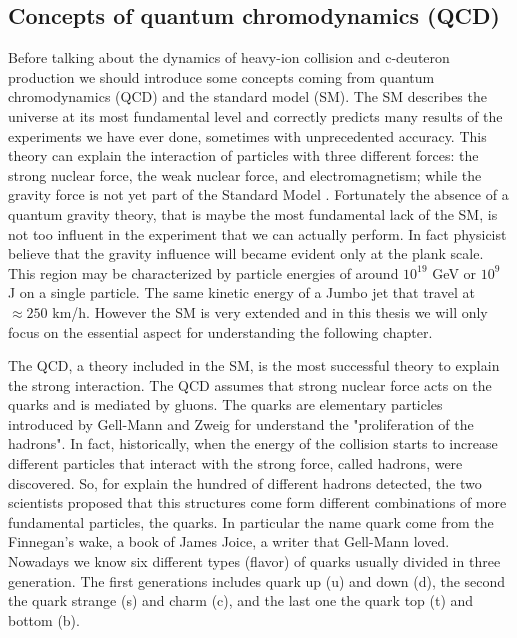 \documentclass[12pt,a4paper]{book}
\begin{document}
	\subsection{Concepts of quantum chromodynamics (QCD)}
	Before talking about the dynamics of heavy-ion collision and c-deuteron production we should introduce some concepts coming from quantum chromodynamics (QCD) and the standard model (SM). The SM describes the universe at its most fundamental level and correctly predicts many results of the experiments we have ever done, sometimes with unprecedented accuracy. This theory can explain the interaction of particles with three different forces: the strong nuclear force, the weak nuclear force, and electromagnetism; while the gravity force is not yet part of the Standard Model \cite{quevedo2024cambridgelecturesstandardmodel}. Fortunately the absence of a quantum gravity theory, that is maybe the most fundamental lack of the SM, is not too influent in the experiment that we can actually perform. In fact physicist believe that the gravity influence will became evident only at the plank scale. This region may be characterized by particle energies of around $10^{19}$ GeV or $10^9$ J on a single particle. The same kinetic energy of a Jumbo jet that travel at $\approx 250$ km/h. However the SM is very extended and in this thesis we will only focus on the essential aspect for understanding the following chapter.
	
	
	The QCD, a theory included in the SM, is the most successful theory to explain the strong interaction. The QCD assumes that strong nuclear force acts on the quarks and is mediated by gluons. The quarks are elementary particles introduced by Gell-Mann and Zweig for understand the "proliferation of the hadrons". In fact, historically, when the energy of the collision starts to increase different particles that interact with the strong force, called hadrons, were discovered. So, for explain the hundred of different hadrons detected, the two scientists proposed that this structures come form different combinations of more fundamental particles, the quarks. In particular the name quark come from the Finnegan's wake, a book of James Joice, a writer that Gell-Mann loved. Nowadays we know six different types (flavor) of quarks usually divided in three generation. The first generations includes quark up (u) and down (d), the second the quark strange (s) and charm (c), and the last one the quark top (t) and bottom (b). 
	
\end{document}
